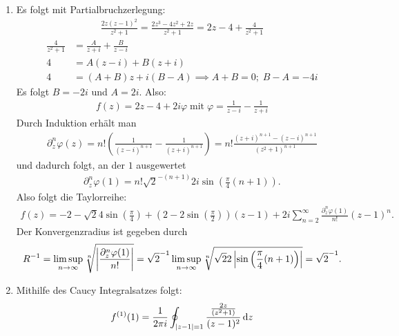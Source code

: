 \documentclass[ngerman]{report}
\begin{document}
\begin{answer}
    \begin{enumerate}
        \item Es folgt mit Partialbruchzerlegung:
        \begin{align*}
            \frac{2z(z-1)^2}{z^2+1} = \frac{2z^3-4z^2+2z}{z^2+1} = 2z - 4 + \frac{4}{z^2+1} 
        \end{align*}
        \begin{align*}
            \frac{4}{z^2+1} &= \frac{A}{z+i} + \frac{B}{z-i}\\
            4 &= A(z-i) + B(z+i)\\
            4 &= (A+B)z +i(B-A) \implies A+B = 0; \; B-A = -4i
        \end{align*}
        Es folgt $B = -2i$ und $A = 2i$. Also:
        \begin{align*}
            f(z) = 2z - 4 + 2i\varphi \;\text{mit}\;\varphi = \frac{1}{z-i} - \frac{1}{z+i}
        \end{align*}
        Durch Induktion erhält man
        \begin{align*}
            \partial^n_z \varphi(z) = n! \left(\frac{1}{(z-i)^{n+1}} - \frac{1}{(z+i)^{n+1}}\right)= n! \frac{(z+i)^{n+1}-(z-i)^{n+1}}{(z^2+1)^{n+1}}
        \end{align*}
        und dadurch folgt, an der $1$ ausgewertet
        \begin{align*}
            \partial^n_z \varphi(1) = n! \sqrt{2}^{-(n+1)}2i\sin\left(\frac{\pi}{4}(n+1)\right).
        \end{align*}
        Also folgt die Taylorreihe:
        \begin{align*}
            f(z) = -2 - \sqrt{2}4\sin\left(\frac{\pi}{4}\right)+\left(2-2\sin\left(\frac{\pi}{2}\right)\right)(z-1)+2i\sum_{n=2}^\infty \frac{\partial^n_z \varphi(1)}{n!}(z-1)^n.
        \end{align*}
        Der Konvergenzradius ist gegeben durch 
        \begin{align*}
            R^{-1} = \limsup_{n\to\infty} \sqrt[n]{\left|\frac{\partial^n_z \varphi(1)}{n!}\right|} = \sqrt{2}^{-1}\limsup_{n\to\infty} \sqrt[n]{\sqrt{2}2\left|\sin\left(\frac{\pi}{4}(n+1)\right)\right|} = \sqrt{2}^{-1}.
        \end{align*}
        \item Mithilfe des Caucy Integralsatzes folgt:
        \begin{align*}
            f^{(1)}(1) = \frac{1}{2\pi i}\oint_{\abs{z-1}=1} \frac{\frac{2z}{(z^2+1)}}{(z-1)^2}\dd{z} 

\end{align*}
\end{enumerate}
\end{answer}
\end{document}
